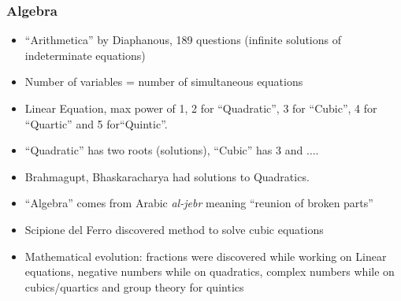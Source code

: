 \begin{frame}[fragile]
\begin{itemize}
\end{itemize}
\end{frame}


\begin{frame}[fragile]
\frametitle{Algebra}
\begin{itemize}
\item ``Arithmetica'' by Diaphanous, 189 questions (infinite solutions of indeterminate equations)
\item Number of variables = number of simultaneous equations
\item Linear Equation, max power of 1, 2 for ``Quadratic'', 3  for ``Cubic'', 4 for ``Quartic'' and 5 for``Quintic''.
\item ``Quadratic'' has two roots (solutions), ``Cubic'' has 3 and $\dots$.
\item Brahmagupt, Bhaskaracharya had solutions to Quadratics.
\item ``Algebra'' comes from Arabic {\it al-jebr} meaning ``reunion of broken parts''
\item Scipione del Ferro discovered method to solve cubic equations
\item Mathematical evolution: fractions were discovered while working on Linear equations, negative numbers while on quadratics, complex numbers while on cubics/quartics and group theory for quintics
\end{itemize}
\end{frame}

